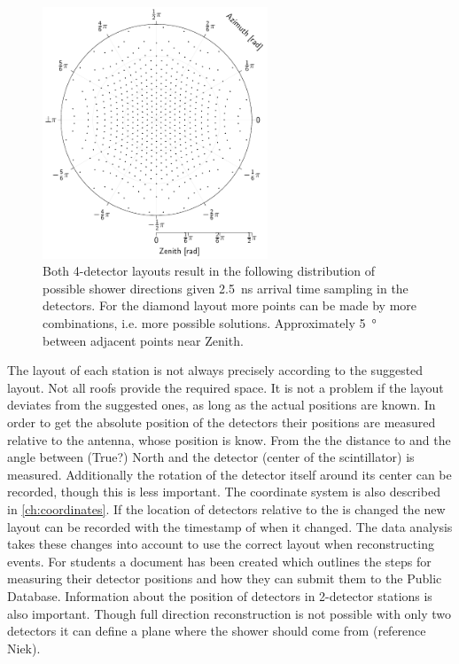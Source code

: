 \begin{figure}
    \centering
    \includegraphics[width=0.6\textwidth]
                    {plots/experiment/discrete_directions}
    \caption{Both 4-detector layouts result in the following distribution of possible shower directions given \SI{2.5}{\ns} arrival time sampling in the detectors. For the diamond layout more points can be made by more combinations, i.e. more possible solutions. Approximately \SI{5}{\degree} between adjacent points near Zenith.}
    \label{fig:discrete_directions}
\end{figure}

The layout of each station is not always precisely according to the suggested layout. Not all roofs provide the required space. It is not a problem if the layout deviates from the suggested ones, as long as the actual positions are known. In order to get the absolute position of the detectors their positions are measured relative to the \gps antenna, whose position is know. From the \gps the distance to and the angle between (True?) North and the detector (center of the scintillator) is measured. Additionally the rotation of the detector itself around its center can be recorded, though this is less important. The coordinate system is also described in \cref{ch:coordinates}. If the location of detectors relative to the \gps is changed the new layout can be recorded with the timestamp of when it changed. The data analysis takes these changes into account to use the correct layout when reconstructing events. For students a document has been created which outlines the steps for measuring their detector positions and how they can submit them to the Public Database. Information about the position of detectors in 2-detector stations is also important. Though full direction reconstruction is not possible with only two detectors it can define a plane where the shower should come from (reference Niek).

